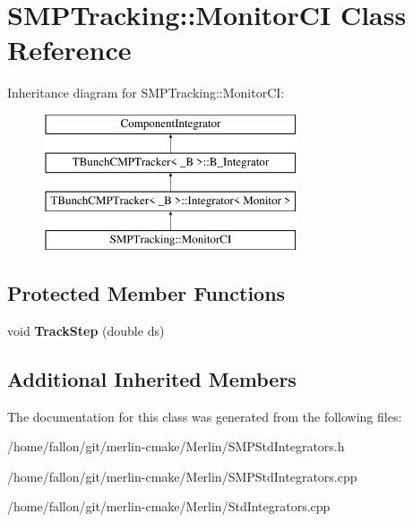 \hypertarget{classSMPTracking_1_1MonitorCI}{}\section{S\+M\+P\+Tracking\+:\+:Monitor\+CI Class Reference}
\label{classSMPTracking_1_1MonitorCI}
Inheritance diagram for S\+M\+P\+Tracking\+:\+:Monitor\+CI\+:\begin{figure}[H]
\begin{center}
\leavevmode
\includegraphics[height=4.000000cm]{classSMPTracking_1_1MonitorCI}
\end{center}
\end{figure}
\subsection*{Protected Member Functions}
\begin{DoxyCompactItemize}
\item 
\mbox{\label{classSMPTracking_1_1MonitorCI_af8876bf6eecc81c1c51b1dca45bda413}} 
void {\bfseries Track\+Step} (double ds)
\end{DoxyCompactItemize}
\subsection*{Additional Inherited Members}


The documentation for this class was generated from the following files\+:\begin{DoxyCompactItemize}
\item 
/home/fallon/git/merlin-\/cmake/\+Merlin/S\+M\+P\+Std\+Integrators.\+h\item 
/home/fallon/git/merlin-\/cmake/\+Merlin/S\+M\+P\+Std\+Integrators.\+cpp\item 
/home/fallon/git/merlin-\/cmake/\+Merlin/Std\+Integrators.\+cpp\end{DoxyCompactItemize}
